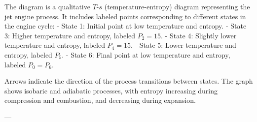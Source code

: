 The diagram is a qualitative \( T \)-\( s \) (temperature-entropy) diagram representing the jet engine process. It includes labeled points corresponding to different states in the engine cycle:  
- State 1: Initial point at low temperature and entropy.  
- State 3: Higher temperature and entropy, labeled \( P_2 = 15 \).  
- State 4: Slightly lower temperature and entropy, labeled \( P_4 = 15 \).  
- State 5: Lower temperature and entropy, labeled \( P_5 \).  
- State 6: Final point at low temperature and entropy, labeled \( P_0 = P_6 \).  

Arrows indicate the direction of the process transitions between states. The graph shows isobaric and adiabatic processes, with entropy increasing during compression and combustion, and decreasing during expansion.  

---